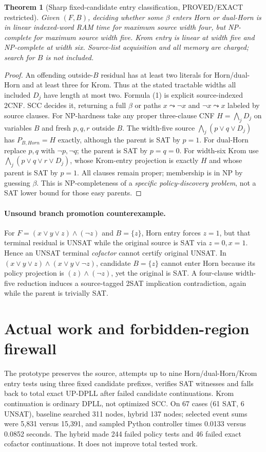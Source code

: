 \documentclass[11pt]{article}
\newtheorem{theorem}{Theorem}
\begin{document}
\begin{theorem}[Sharp fixed-candidate entry classification, PROVED/EXACT restricted]
Given $(F,B)$, deciding whether some $\beta$ enters Horn or dual-Horn is in linear indexed-word RAM time for maximum source width four, but NP-complete for maximum source width five. Krom entry is linear at width five and NP-complete at width six. Source-list acquisition and all memory are charged; search for $B$ is not included.
\end{theorem}
\begin{proof}
An offending outside-$B$ residual has at least two literals for Horn/dual-Horn and at least three for Krom. Thus at the stated tractable widths all included $D_j$ have length at most two. Formula (1) is explicit source-indexed 2CNF. SCC decides it, returning a full $\beta$ or paths $x\leadsto\neg x$ and $\neg x\leadsto x$ labeled by source clauses. For NP-hardness take any proper three-clause CNF $H=\bigwedge_j D_j$ on variables $B$ and fresh $p,q,r$ outside $B$. The width-five source $\bigwedge_j(p\vee q\vee D_j)$ has $P_{B,Horn}=H$ exactly, although the parent is SAT by $p=1$. For dual-Horn replace $p,q$ with $\neg p,\neg q$; the parent is SAT by $p=q=0$. For width-six Krom use $\bigwedge_j(p\vee q\vee r\vee D_j)$, whose Krom-entry projection is exactly $H$ and whose parent is SAT by $p=1$. All clauses remain proper; membership is in NP by guessing $\beta$. This is NP-completeness of a \emph{specific policy-discovery problem}, not a SAT lower bound for those easy parents.
\end{proof}

\paragraph{Unsound branch promotion counterexample.}
For $F=(x\vee y\vee z)\land(\neg z)$ and $B=\{z\}$, Horn entry forces $z=1$, but that terminal residual is UNSAT while the original source is SAT via $z=0,x=1$. Hence an UNSAT terminal \emph{cofactor} cannot certify original UNSAT. In $(x\vee y\vee z)\land(x\vee y\vee\neg z)$, candidate $B=\{z\}$ cannot enter Horn because its policy projection is $(z)\land(\neg z)$, yet the original is SAT. A four-clause width-five reduction induces a source-tagged 2SAT implication contradiction, again while the parent is trivially SAT.

\section{Actual work and forbidden-region firewall}
The prototype preserves the source, attempts up to nine Horn/dual-Horn/Krom entry tests using three fixed candidate prefixes, verifies SAT witnesses and falls back to total exact UP-DPLL after failed candidate continuations. Krom continuation is ordinary DPLL, not optimized SCC. On 67 cases (61 SAT, 6 UNSAT), baseline searched 311 nodes, hybrid 137 nodes; selected event sums were 5,831 versus 15,391, and sampled Python controller times 0.0133 versus 0.0852 seconds. The hybrid made 244 failed policy tests and 46 failed exact cofactor continuations. It does not improve total tested work.
\end{document}
